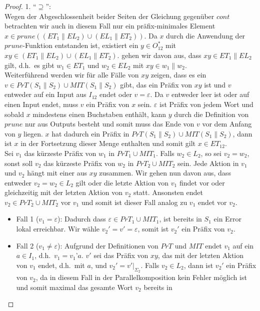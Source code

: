 \begin{proof}
  1. ``$\supseteq$'':\\
  Wegen der Abgeschlossenheit beider Seiten der Gleichung gegenüber $cont$
  betrachten wir auch in diesem Fall nur ein präfix-minimales Element $x\in
  prune((ET_1\|EL_2)\cup (EL_1\|ET_2))$. Da $x$ durch die Anwendung der
  $prune$-Funktion entstanden ist, existiert ein $y\in O_{12}^*$ mit
  $xy\in(ET_1\|EL_2)\cup (EL_1\|ET_2)$. \OBdA{} gehen wir davon aus, dass
  $xy\in ET_1\|EL_2$ gilt, d.h.\ es gibt $w_1\in ET_1$ und $w_2\in EL_2$ mit
  $xy\in w_1\|w_2$.\\
  Weiterführend werden wir für alle Fälle von $xy$ zeigen, dass es ein $v\in
  PrT(S_1\|S_2)\cup MIT(S_1\|S_2)$ gibt, das ein Präfix von $xy$ ist und $v$
  entweder auf ein Input aus $I_{12}$ endet oder $v = \varepsilon$. Da $v$
  entweder leer ist oder auf einen Input endet, muss $v$ ein Präfix von $x$
  sein. $\varepsilon$ ist Präfix von jedem Wort und sobald $x$ mindestens einen
  Buchstaben enthält, kann $y$ durch die Definition von $prune$ nur aus Outputs
  besteht und somit muss das Ende von $v$ vor dem Anfang von $y$ liegen. $x$
  hat dadurch ein Präfix in $PrT(S_1\|S_2)\cup MIT(S_1\|S_2)$, dann ist $x$ in
  der Fortsetzung dieser Menge enthalten und somit gilt $x\in ET_{12}$.\\
  Sei $v_1$ das kürzeste Präfix von $w_1$ in $PrT_1\cup MIT_1$. Falls
  $w_2\in L_2$, so sei $v_2=w_2$, sonst soll $v_2$ das kürzeste Präfix von
  $w_2$ in $PrT_2\cup MIT_2$ sein. Jede Aktion in $v_1$ und $v_2$ hängt mit
  einer aus $xy$ zusammen. Wir gehen nun davon aus, dass entweder
  $v_2=w_2\in L_2$ gilt oder die letzte Aktion von $v_1$ findet vor oder
  gleichzeitig mit der letzten Aktion von $v_2$ statt. Ansonsten endet
  $v_2\in PrT_2\cup MIT_2$ vor $v_1$ und somit ist dieser Fall analog zu $v_1$
  endet vor $v_2$.
  \begin{itemize}
    \item Fall 1 ($v_1=\varepsilon$): Dadurch dass $\varepsilon\in PrT_1\cup
      MIT_1$, ist bereits in $S_1$ ein Error lokal erreichbar. Wir wähle
      $v_2'=v'=\varepsilon$, somit ist $v_2'$ ein Präfix von $v_2$.
    \item Fall 2 ($v_1\neq\varepsilon$): Aufgrund der Definitionen von $PrT$
      und $MIT$ endet $v_1$ auf ein $a\in I_1$, d.h.\ $v_1=v_1’a$. $v'$ sei das
      Präfix von $xy$, das mit der letzten Aktion von $v_1$ endet, d.h.\ mit
      $a$, und $v_2'=v'|_{\Sigma _{2}}$. Falls $v_2\in L_2$, dann ist
      $v_2'$ ein Präfix von $v_2$, da in diesem Fall in der
      Parallelkomposition kein Fehler möglich ist und somit maximal das gesamte Wort $v_2$ bereits in

\end{itemize}
\end{proof}
